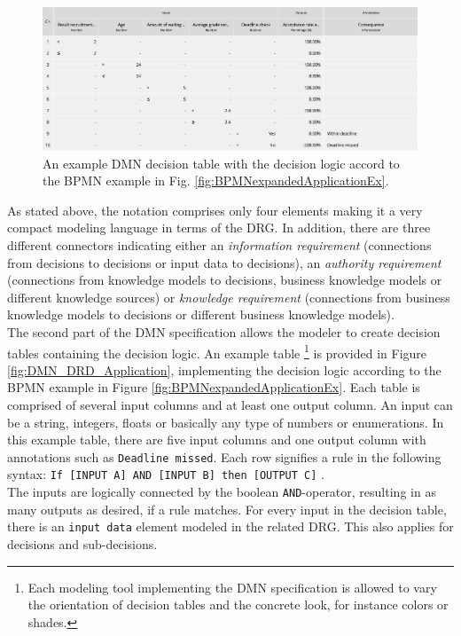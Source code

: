 \begin{figure}
\includegraphics[width=\textwidth]{../figures/chapter_indicators/DMN_Application_Example_Decision_Table_ToR.png} 
\caption{An example DMN decision table with the decision logic accord to the BPMN example in Fig. \ref{fig:BPMNexpandedApplicationEx}.}
\label{fig:DMN_decision_table_application}
\end{figure}
As stated above, the notation comprises only four elements making it a very compact modeling language in terms of the \ac{DRG}. In addition, there are three different connectors indicating either an \textit{information requirement} (connections from decisions to decisions or input data to decisions), an \textit{authority requirement} (connections from knowledge models to decisions, business knowledge models or different knowledge sources) or \textit{knowledge requirement} (connections from business knowledge models to decisions or different business knowledge models). \\
The second part of the DMN specification allows the modeler to create decision tables containing the decision logic. An example table \footnote{Each modeling tool implementing the DMN specification is allowed to vary the orientation of decision tables and the concrete look, for instance colors or shades.} is provided in Figure \ref{fig:DMN_DRD_Application}, implementing the decision logic according to the BPMN example in Figure \ref{fig:BPMNexpandedApplicationEx}. Each table is comprised of several input columns and at least one output column. An input can be a string, integers, floats or basically any type of numbers or enumerations. In this example table, there are five input columns and one output column with annotations such as \texttt{Deadline missed}. Each row signifies a rule in the following syntax: \texttt{If [INPUT A] AND [INPUT B] then [OUTPUT C]} \cite{DMNspec2016}. \\
The inputs are logically connected by the boolean \texttt{AND}-operator, resulting in as many outputs as desired, if a rule matches. For every input in the decision table, there is an \texttt{input data} element modeled in the related \ac{DRG}. This also applies for decisions and sub-decisions. \\
